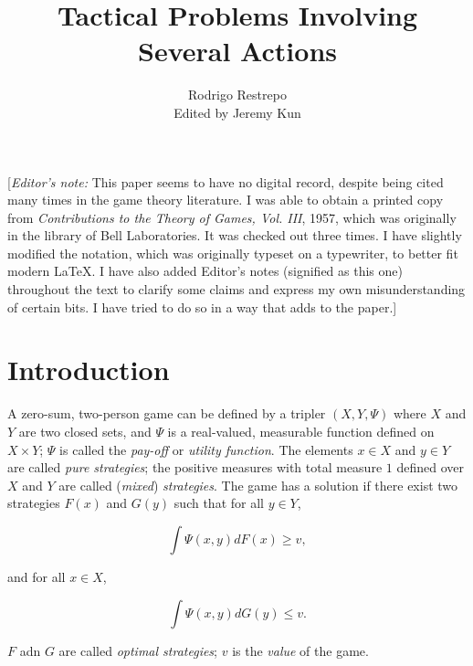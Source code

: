 \documentclass{article}
\title{Tactical Problems Involving Several Actions}
\author{Rodrigo Restrepo \\ Edited by Jeremy Kun}
\begin{document}
\maketitle


[\emph{Editor's note:} This paper seems to have no digital record, despite
being cited many times in the game theory literature. I was able to obtain a
printed copy from \emph{Contributions to the Theory of Games, Vol.  III}, 1957,
which was originally in the library of Bell Laboratories. It was checked out
three times. I have slightly modified the notation, which was originally
typeset on a typewriter, to better fit modern LaTeX. I have also added Editor's
notes (signified as this one) throughout the text to clarify some claims and
express my own misunderstanding of certain bits. I have tried to do so in a way
that adds to the paper.]

\section{Introduction}

A zero-sum, two-person game can be defined by a tripler $(X, Y, \Psi)$ where
$X$ and $Y$ are two closed sets, and $\Psi$ is a real-valued, measurable
function defined on $X \times Y$; $\Psi$ is called the \emph{pay-off} or
\emph{utility function}. The elements $x \in X$ and $y \in Y$ are called
\emph{pure strategies}; the positive measures with total measure $1$ defined
over $X$ and $Y$ are called (\emph{mixed}) \emph{strategies}. The game has a
solution if there exist two strategies $F(x)$ and $G(y)$ such that for all $y
\in Y$,

\[
    \int \Psi(x, y) dF(x) \geq v,
\]

and for all $x \in X$,

\[
    \int \Psi(x, y) dG(y) \leq v.
\]

$F$ adn $G$ are called \emph{optimal strategies}; $v$ is the \emph{value} of
the game.
\end{document}

